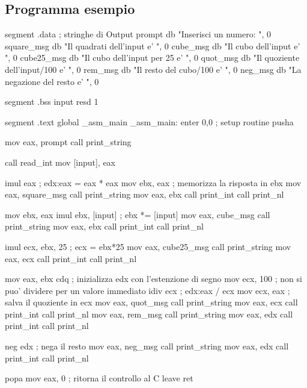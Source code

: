 \subsection{Programma esempio}
\begin{AsmCodeListing}[label=math.asm]
segment .data         ; stringhe di Output 
prompt          db    "Inserisci un numero: ", 0
square_msg      db    "Il quadrati dell'input e' ", 0
cube_msg        db    "Il cubo dell'input e' ", 0
cube25_msg      db    "Il cubo dell'input per 25 e' ", 0
quot_msg        db    "Il quoziente dell'input/100 e' ", 0
rem_msg         db    "Il resto del cubo/100 e' ", 0
neg_msg         db    "La negazione del resto e' ", 0

segment .bss
input   resd 1

segment .text
        global  _asm_main
_asm_main:
        enter   0,0               ; setup routine
	pusha

        mov     eax, prompt
        call    print_string

        call    read_int
        mov     [input], eax

        imul    eax               ; edx:eax = eax * eax
        mov     ebx, eax          ; memorizza la risposta in ebx
        mov     eax, square_msg
        call    print_string
        mov     eax, ebx
        call    print_int
        call    print_nl

        mov     ebx, eax
        imul    ebx, [input]      ; ebx *= [input]
        mov     eax, cube_msg
        call    print_string
        mov     eax, ebx
        call    print_int
        call    print_nl

        imul    ecx, ebx, 25      ; ecx = ebx*25
        mov     eax, cube25_msg
        call    print_string
        mov     eax, ecx
        call    print_int
        call    print_nl

        mov     eax, ebx
        cdq                       ; inizializza edx con l'estenzione di segno
        mov     ecx, 100          ; non si puo' dividere per un valore immediato
        idiv    ecx               ; edx:eax / ecx
        mov     ecx, eax          ; salva il quoziente in ecx
        mov     eax, quot_msg
        call    print_string
        mov     eax, ecx
        call    print_int
        call    print_nl
        mov     eax, rem_msg
        call    print_string
        mov     eax, edx
        call    print_int
        call    print_nl
        
        neg     edx               ; nega il resto
        mov     eax, neg_msg
        call    print_string
        mov     eax, edx
        call    print_int
        call    print_nl

        popa
        mov     eax, 0            ; ritorna il controllo al C
        leave                     
        ret
\end{AsmCodeListing}


